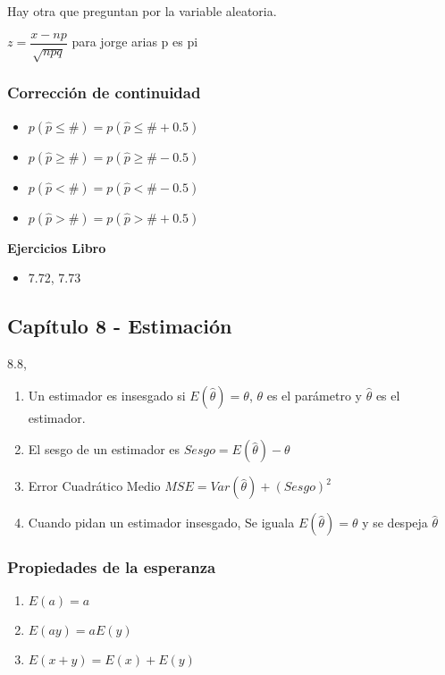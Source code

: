 Hay otra que preguntan por la variable aleatoria.

$z=\dfrac{x-np}{\sqrt{npq}}$ para jorge arias p es pi

\subsubsection{Corrección de continuidad}
\begin{itemize}
	\item $p(\hat{p}\le \#)=p(\hat{p}\le \#+0.5)$
	\item $p(\hat{p}\ge \#)=p(\hat{p}\ge \#-0.5)$
	\item $p(\hat{p} < \#)=p(\hat{p}< \#-0.5)$
	\item $p(\hat{p} > \#)=p(\hat{p}> \#+0.5)$
\end{itemize}

\textbf{Ejercicios Libro}
\begin{itemize}
	\item 7.72, 7.73
	\end{itemize}


\subsection{Capítulo 8 - Estimación}

8.8,

\begin{enumerate}
	\item Un estimador es insesgado si $E(\hat{\theta})=\theta$, $\theta$ es el parámetro y $\hat{\theta}$ es el estimador.
	\item El sesgo de un estimador es $Sesgo=E(\hat{\theta})-\theta $
	\item Error Cuadrático Medio $MSE=Var(\hat{\theta})+(Sesgo)^2$
	\item Cuando pidan un estimador insesgado, Se iguala $E(\hat{\theta})=\theta$ y se despeja $\hat{\theta}$
\end{enumerate}

\subsubsection{Propiedades de la esperanza}
\begin{enumerate}
	\item $E(a)=a$
	\item $E(ay)=aE(y)$
	\item $E(x+y)=E(x)+E(y)$
\end{enumerate}

